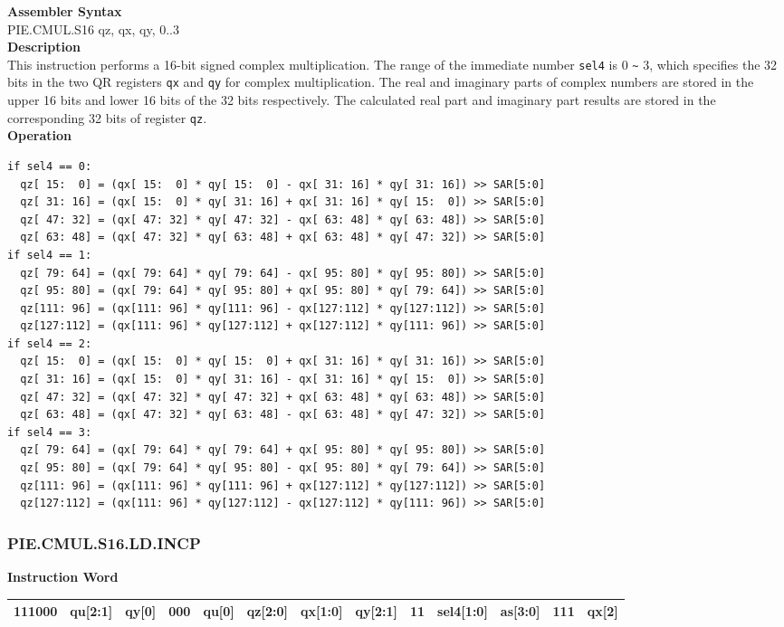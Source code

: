 \textbf{Assembler Syntax} \\
PIE.CMUL.S16 qz, qx, qy, 0..3 \\
\textbf{Description} \\
This instruction performs a 16-bit signed complex multiplication. The range of the immediate number \lstinline{sel4} is 0 \verb+~+ 3, which specifies the 32 bits in the two QR registers \lstinline{qx} and \lstinline{qy} for complex multiplication. The real and imaginary parts of complex numbers are stored in the upper 16 bits and lower 16 bits of the 32 bits respectively. The calculated real part and imaginary part results are stored in the corresponding 32 bits of register \lstinline{qz}.\\
\textbf{Operation}
\begin{lstlisting}
if sel4 == 0:
  qz[ 15:  0] = (qx[ 15:  0] * qy[ 15:  0] - qx[ 31: 16] * qy[ 31: 16]) >> SAR[5:0]
  qz[ 31: 16] = (qx[ 15:  0] * qy[ 31: 16] + qx[ 31: 16] * qy[ 15:  0]) >> SAR[5:0]
  qz[ 47: 32] = (qx[ 47: 32] * qy[ 47: 32] - qx[ 63: 48] * qy[ 63: 48]) >> SAR[5:0]
  qz[ 63: 48] = (qx[ 47: 32] * qy[ 63: 48] + qx[ 63: 48] * qy[ 47: 32]) >> SAR[5:0]
if sel4 == 1:
  qz[ 79: 64] = (qx[ 79: 64] * qy[ 79: 64] - qx[ 95: 80] * qy[ 95: 80]) >> SAR[5:0]
  qz[ 95: 80] = (qx[ 79: 64] * qy[ 95: 80] + qx[ 95: 80] * qy[ 79: 64]) >> SAR[5:0]
  qz[111: 96] = (qx[111: 96] * qy[111: 96] - qx[127:112] * qy[127:112]) >> SAR[5:0]
  qz[127:112] = (qx[111: 96] * qy[127:112] + qx[127:112] * qy[111: 96]) >> SAR[5:0]
if sel4 == 2:
  qz[ 15:  0] = (qx[ 15:  0] * qy[ 15:  0] + qx[ 31: 16] * qy[ 31: 16]) >> SAR[5:0]
  qz[ 31: 16] = (qx[ 15:  0] * qy[ 31: 16] - qx[ 31: 16] * qy[ 15:  0]) >> SAR[5:0]
  qz[ 47: 32] = (qx[ 47: 32] * qy[ 47: 32] + qx[ 63: 48] * qy[ 63: 48]) >> SAR[5:0]
  qz[ 63: 48] = (qx[ 47: 32] * qy[ 63: 48] - qx[ 63: 48] * qy[ 47: 32]) >> SAR[5:0]
if sel4 == 3:
  qz[ 79: 64] = (qx[ 79: 64] * qy[ 79: 64] + qx[ 95: 80] * qy[ 95: 80]) >> SAR[5:0]
  qz[ 95: 80] = (qx[ 79: 64] * qy[ 95: 80] - qx[ 95: 80] * qy[ 79: 64]) >> SAR[5:0]
  qz[111: 96] = (qx[111: 96] * qy[111: 96] + qx[127:112] * qy[127:112]) >> SAR[5:0]
  qz[127:112] = (qx[111: 96] * qy[127:112] - qx[127:112] * qy[111: 96]) >> SAR[5:0]
\end{lstlisting}

\newpage
\subsubsection{PIE.CMUL.S16.LD.INCP}\label{instruction:PIECMULS16LDINCP}
\setlength\tabcolsep{6pt}
\textbf{Instruction Word} \\
\begin{tabular}{|c|c|c|c|c|c|c|c|c|c|c|c|c|}
	\hline
	111000 & qu[2:1] & qy[0] & 000 & qu[0] & qz[2:0] & qx[1:0] & qy[2:1] & 11 & sel4[1:0] & as[3:0] & 111 & qx[2] \\
	\hline
\end{tabular}

